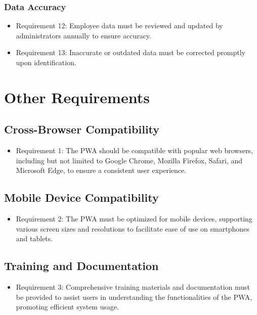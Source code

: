 \documentclass{scrreprt}
\begin{document}
\subsection{Data Accuracy}

\begin{itemize}
    \item Requirement 12: Employee data must be reviewed and updated by administrators annually to ensure accuracy.
    \item Requirement 13: Inaccurate or outdated data must be corrected promptly upon identification.
\end{itemize}


\chapter{Other Requirements}

\section{Cross-Browser Compatibility}

\begin{itemize}
    \item Requirement 1: The PWA should be compatible with popular web browsers, including but not limited to Google Chrome, Mozilla Firefox, Safari, and Microsoft Edge, to ensure a consistent user experience.
\end{itemize}

\section{Mobile Device Compatibility}

\begin{itemize}
    \item Requirement 2: The PWA must be optimized for mobile devices, supporting various screen sizes and resolutions to facilitate ease of use on smartphones and tablets.
\end{itemize}

\section{Training and Documentation}

\begin{itemize}
    \item Requirement 3: Comprehensive training materials and documentation must be provided to assist users in understanding the functionalities of the PWA, promoting efficient system usage.
\end{itemize}
\end{document}
